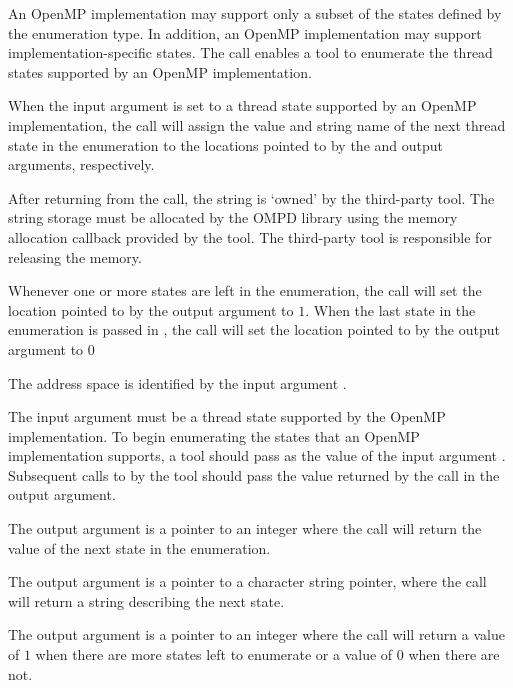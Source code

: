 \descr
An OpenMP implementation may support only a subset of the states defined by
the  enumeration type. In addition, an
OpenMP implementation may support implementation-specific states.
The  call enables a tool to
enumerate the thread states supported by an OpenMP implementation.

When the  input argument is set to a 
thread state supported by an OpenMP implementation,
the call will assign the value and string name of the next thread state in the enumeration
to the locations pointed to by the 
 and  output arguments, respectively.

After returning from the call, the string  is `owned' by the 
third-party tool.
The string storage must be allocated by the OMPD library using the memory allocation 
callback provided by the tool.
The third-party tool is responsible for releasing the memory.

Whenever one or more states are left in the enumeration,
the call will set the location pointed to by the  
output argument to $1$.
When the last state in the enumeration is passed in , 
the call will set the location pointed to by the  output
argument to $0$


\argdesc

The address space is identified by the input argument .

The input argument  must be a thread state
supported by the OpenMP implementation.  To begin enumerating the
states that an OpenMP implementation supports, a tool should pass
 as the value of the input argument .  Subsequent
calls to  by the tool should pass the
value returned by the call in the  output argument.

The output argument  is a pointer to an integer where
the call will return the value of the next state in the
enumeration.

The output argument  is a pointer to a
character string pointer, where the call will return a string
describing the next state.

The output argument  is a pointer to an integer where
the call will return a value of $1$ when there are more states left to enumerate
or a value of $0$ when there are not.

